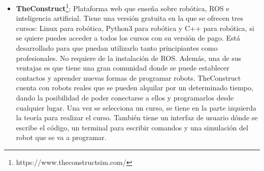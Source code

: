 \begin{itemize}
\item \textbf{TheConstruct}\footnote{https://www.theconstructsim.com/}: Plataforma web que enseña sobre robótica, ROS e inteligencia artificial. Tiene una versión gratuita en la que se ofrecen tres cursos: Linux para robótica, Python3 para robótica y C++ para robótica, si se quiere puedes acceder a todos los cursos con su versión de pago. Está desarrollado para que puedan utilizarlo tanto principiantes como profesionales. No requiere de la instalación de ROS. Además, una de sus ventajas es que tiene una gran comunidad donde se puede establecer contactos y aprender nuevas formas de programar robots. TheConstruct cuenta con robots reales que se pueden alquilar por un determinado tiempo, dando la posibilidad de poder conectarse a ellos y programarlos desde cualquier lugar. Una vez se selecciona un curso, se tiene en la parte izquierda la teoría para realizar el curso. También tiene un interfaz de usuario dónde se escribe el código, un terminal para escribir comandos y una simulación del robot que se va a programar.


\end{itemize}

